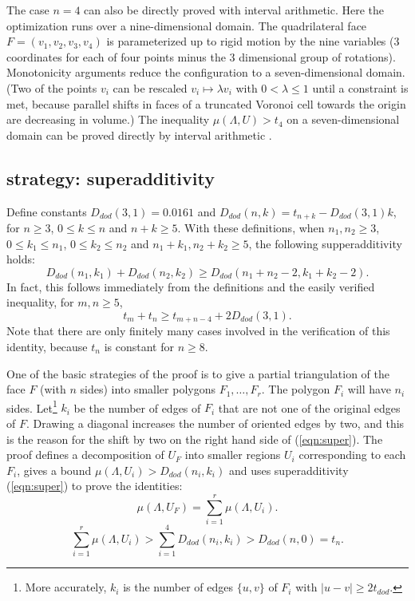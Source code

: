 The case $n=4$ can also be directly proved with interval arithmetic.  
Here the optimization runs over a nine-dimensional domain.  The
quadrilateral face $F=(v_1,v_2,v_3,v_4)$ is parameterized up to rigid
motion by the nine variables (3 coordinates for each of four points
minus the 3 dimensional group of rotations).  Monotonicity arguments
reduce the configuration to a seven-dimensional domain.  (Two of the
points $v_i$ can be rescaled $v_i \mapsto \lambda v_i$ with $0 < \lambda \le 1$ until a constraint is met, 
because parallel shifts in faces of a truncated Voronoi cell towards the origin are decreasing in volume.)  The inequality $\mu(\Lambda,U)> t_4$ on
a seven-dimensional domain can be proved directly by interval arithmetic \cite[XX]{code}.

\subsection{strategy: superadditivity}

Define constants $D_{dod}(3,1) = 0.0161$ and $D_{dod}(n,k) = t_{n+k} - D_{dod}(3,1)k$,
for $n\ge 3$, $0\le k\le n$ and $n+k\ge 5$.  With these definitions,
when $n_1,n_2\ge 3$, $0\le k_1\le n_1$, $0\le k_2\le n_2$ and $n_1+k_1,n_2+k_2\ge 5$,  the following supperadditivity holds:
\begin{equation}\label{eqn:super}
  D_{dod}(n_1,k_1) + D_{dod}(n_2,k_2) \ge D_{dod}(n_1+n_2-2,k_1+k_2-2).
\end{equation}
In fact, this follows immediately from the definitions and the
easily verified inequality,
for $m,n\ge 5$,
$$
t_m + t_n \ge t_{m+n-4} + 2 D_{dod}(3,1).
$$
Note that there are only finitely many cases involved in the
verification of this identity,
because $t_n$ is constant for $n\ge 8$.


One of the basic strategies of the proof is to give a partial triangulation
of the face $F$ (with $n$ sides)
into smaller polygons $F_1,\ldots,F_r$.   The polygon
$F_i$ will have $n_i$ sides.  Let\footnote{More accurately,
$k_i$ is the number of edges $\{u,v\}$ of $F_i$ with $|u-v|\ge 2t_{dod}$.} 
$k_i$ be the number of edges
of $F_i$ that are not one of the original edges of $F$. 
Drawing a diagonal increases the number of oriented edges by
two, and this is the reason for the shift by two on the right
hand side of (\ref{eqn:super}).   The proof defines
a decomposition of $U_F$ into smaller regions $U_i$ corresponding
to each $F_i$, gives a bound $\mu(\Lambda,U_i) > D_{dod}(n_i,k_i)$
and uses superadditivity (\ref{eqn:super}) to prove the identities:
\begin{equation}\label{eqn:mu}
  \mu(\Lambda,U_F) = \sum_{i=1}^r \mu(\Lambda,U_i).
\end{equation}
\begin{equation}\label{eqn:super-mu}
\sum_{i=1}^r \mu(\Lambda,U_i) > \sum_{i=1}^4 D_{dod}(n_i,k_i)
 > D_{dod}(n,0) = t_n.
\end{equation}

